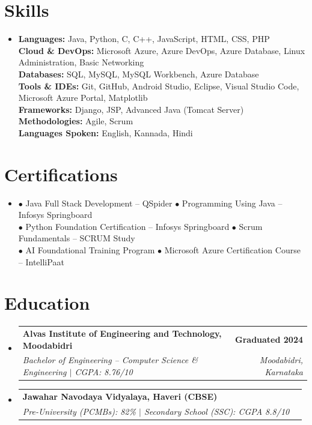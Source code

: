 \documentclass[letterpaper,11pt]{article}
\makeatletter
\newcommand{\resumeSubheading}[4]{
  \vspace{-2pt}\item
    \begin{tabular*}{1.0\textwidth}[t]{l@{\extracolsep{\fill}}r}
      \textbf{#1} & \textbf{\small #2} \\
      \textit{\small#3} & \textit{\small #4} \\
    \end{tabular*}\vspace{-7pt}
}
\newcommand{\resumeSubHeadingListStart}{\begin{itemize}[leftmargin=0.0in, label={}]}
\newcommand{\resumeSubHeadingListEnd}{\end{itemize}}
\makeatother
\begin{document}
\section{Skills}
\begin{itemize}[leftmargin=0.15in, label={}]
\item{
\textbf{Languages:} Java, Python, C, C++, JavaScript, HTML, CSS, PHP \\
\textbf{Cloud \& DevOps:} Microsoft Azure, Azure DevOps, Azure Database, Linux Administration, Basic Networking \\
\textbf{Databases:} SQL, MySQL, MySQL Workbench, Azure Database \\
\textbf{Tools \& IDEs:} Git, GitHub, Android Studio, Eclipse, Visual Studio Code, Microsoft Azure Portal, Matplotlib \\
\textbf{Frameworks:} Django, JSP, Advanced Java (Tomcat Server) \\
\textbf{Methodologies:} Agile, Scrum \\
\textbf{Languages Spoken:} English, Kannada, Hindi
}
\end{itemize}

\vspace{-8pt}

\section{Certifications}
\begin{itemize}[leftmargin=0.15in, label={}]
\item{
$\bullet$ Java Full Stack Development -- QSpider \quad
$\bullet$ Programming Using Java -- Infosys Springboard \\
$\bullet$ Python Foundation Certification -- Infosys Springboard \quad
$\bullet$ Scrum Fundamentals -- SCRUM Study \\
$\bullet$ AI Foundational Training Program \quad
$\bullet$ Microsoft Azure Certification Course -- IntelliPaat
}
\end{itemize}

\vspace{-8pt}

\section{Education}
\resumeSubHeadingListStart

\resumeSubheading
{Alvas Institute of Engineering and Technology, Moodabidri}
{Graduated 2024}
{Bachelor of Engineering -- Computer Science \& Engineering $|$ CGPA: 8.76/10}
{Moodabidri, Karnataka}

\resumeSubheading
{Jawahar Navodaya Vidyalaya, Haveri (CBSE)}
{}
{Pre-University (PCMBs): 82\% \quad $|$ \quad Secondary School (SSC): CGPA 8.8/10}
{}

\resumeSubHeadingListEnd
\end{document}
